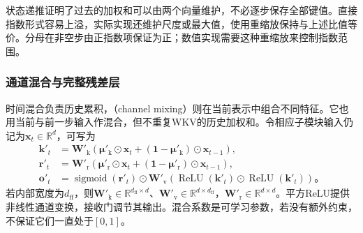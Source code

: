 状态递推证明了过去的加权和可以由两个向量维护，不必逐步保存全部键值。直接指数形式容易上溢，实际实现还维护尺度或最大值，使用重缩放保持与上述比值等价。分母在非空步由正指数项保证为正；数值实现需要这种重缩放来控制指数范围。

\subsubsection{通道混合与完整残差层}
\label{sec:rnn-rwkv-architecture}

时间混合负责历史累积，（channel mixing）则在当前表示中组合不同特征。它也用当前与前一步输入作混合，但不重复WKV的历史加权和。令相应子模块输入仍记为$\bm x_t\in\mathbb R^d$，可写为
\begin{equation}
  \begin{aligned}
    \bm k'_t&=\bm W'_{\mathrm k}\left(\bm\mu'_{\mathrm k}\odot\bm x_t
          +(\bm1-\bm\mu'_{\mathrm k})\odot\bm x_{t-1}\right),\\
    \bm r'_t&=\bm W'_{\mathrm r}\left(\bm\mu'_{\mathrm r}\odot\bm x_t
          +(\bm1-\bm\mu'_{\mathrm r})\odot\bm x_{t-1}\right),\\
    \bm o'_t&=\operatorname{sigmoid}(\bm r'_t)\odot
         \bm W'_{\mathrm v}\left(\operatorname{ReLU}(\bm k'_t)
                              \odot\operatorname{ReLU}(\bm k'_t)\right)\text{。}
  \end{aligned}
  \label{eq:rnn-rwkv-channel-mixing}
\end{equation}
若内部宽度为$d_{\mathrm{ff}}$，则$\bm W'_{\mathrm k}\in\mathbb R^{d_{\mathrm{ff}}\times d}$、$\bm W'_{\mathrm v}\in\mathbb R^{d\times d_{\mathrm{ff}}}$，$\bm W'_{\mathrm r}\in\mathbb R^{d\times d}$。平方ReLU提供非线性通道变换，接收门调节其输出。混合系数是可学习参数，若没有额外约束，不保证它们一直处于$[0,1]$。

